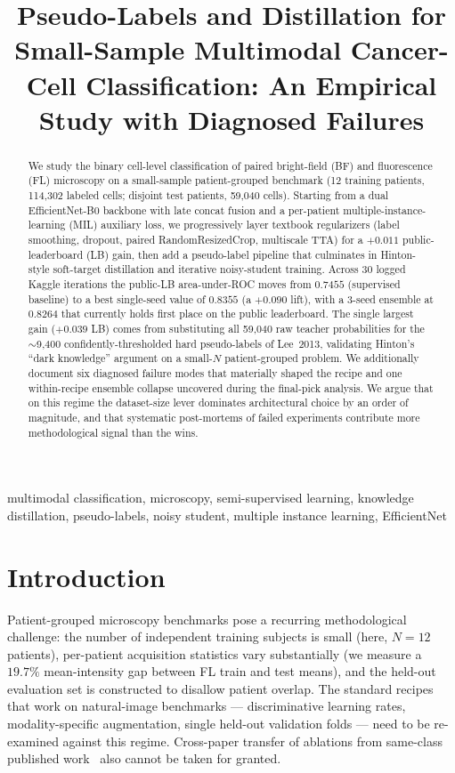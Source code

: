 \documentclass[conference]{IEEEtran}
\title{Pseudo-Labels and Distillation for Small-Sample Multimodal Cancer-Cell Classification: An Empirical Study with Diagnosed Failures}
\author{
  \IEEEauthorblockN{Rafael Tavares Proen\c{c}a}
  \IEEEauthorblockA{
    Department of Information Technology\\
    Uppsala University, Sweden\\
    Email: rafaeltproenca@gmail.com
  }
}
\begin{document}
\maketitle

\begin{abstract}
We study the binary cell-level classification of paired bright-field (BF) and fluorescence (FL) microscopy on a small-sample patient-grouped benchmark (12 training patients, 114{,}302 labeled cells; disjoint test patients, 59{,}040 cells). Starting from a dual EfficientNet-B0 backbone with late concat fusion and a per-patient multiple-instance-learning (MIL) auxiliary loss, we progressively layer textbook regularizers (label smoothing, dropout, paired RandomResizedCrop, multiscale TTA) for a $+0.011$ public-leaderboard (LB) gain, then add a pseudo-label pipeline that culminates in Hinton-style soft-target distillation and iterative noisy-student training. Across 30 logged Kaggle iterations the public-LB area-under-ROC moves from $0.7455$ (supervised baseline) to a best single-seed value of $0.8355$ (a $+0.090$ lift), with a 3-seed ensemble at $0.8264$ that currently holds first place on the public leaderboard. The single largest gain ($+0.039$ LB) comes from substituting all 59{,}040 raw teacher probabilities for the $\sim$9{,}400 confidently-thresholded hard pseudo-labels of Lee~2013, validating Hinton's ``dark knowledge'' argument on a small-$N$ patient-grouped problem. We additionally document six diagnosed failure modes that materially shaped the recipe and one within-recipe ensemble collapse uncovered during the final-pick analysis. We argue that on this regime the dataset-size lever dominates architectural choice by an order of magnitude, and that systematic post-mortems of failed experiments contribute more methodological signal than the wins.
\end{abstract}

\begin{IEEEkeywords}
multimodal classification, microscopy, semi-supervised learning, knowledge distillation, pseudo-labels, noisy student, multiple instance learning, EfficientNet
\end{IEEEkeywords}

\section{Introduction}
\label{sec:intro}

Patient-grouped microscopy benchmarks pose a recurring methodological challenge: the number of independent training subjects is small (here, $N=12$ patients), per-patient acquisition statistics vary substantially (we measure a $19.7\%$ mean-intensity gap between FL train and test means), and the held-out evaluation set is constructed to disallow patient overlap. The standard recipes that work on natural-image benchmarks --- discriminative learning rates, modality-specific augmentation, single held-out validation folds --- need to be re-examined against this regime. Cross-paper transfer of ablations from same-class published work~\cite{lian2024cafnet} also cannot be taken for granted.
\end{document}
